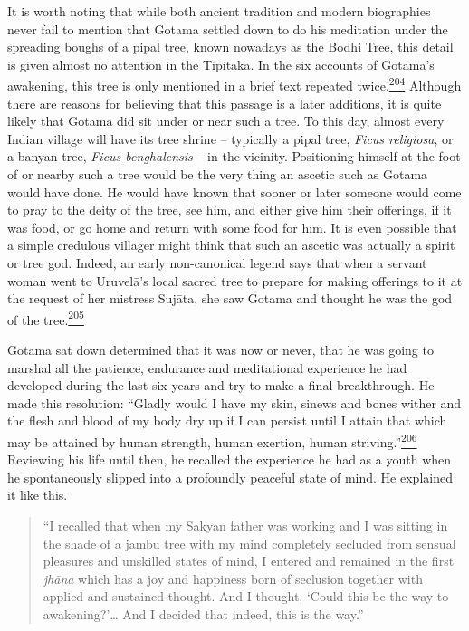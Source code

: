 It is worth noting that while both ancient tradition and modern
biographies never fail to mention that Gotama settled down to do his
meditation under the spreading boughs of a pipal tree, known nowadays as
the Bodhi Tree, this detail is given almost no attention in the
Tipitaka. In the six accounts of Gotama's awakening, this tree is only
mentioned in a brief text repeated
twice.\label{footprints_split_009.html_fnref204}\hyperref[footprints_split_024.htmlux5cux23fn204]{\textsuperscript{204}}
Although there are reasons for believing that this passage is a later
additions, it is quite likely that Gotama did sit under or near such a
tree. To this day, almost every Indian village will have its tree shrine
-- typically a pipal tree, \emph{Ficus religiosa}, or a banyan tree,
\emph{Ficus benghalensis} -- in the vicinity. Positioning himself at the
foot of or nearby such a tree would be the very thing an ascetic such as
Gotama would have done. He would have known that sooner or later someone
would come to pray to the deity of the tree, see him, and either give
him their offerings, if it was food, or go home and return with some
food for him. It is even possible that a simple credulous villager might
think that such an ascetic was actually a spirit or tree god. Indeed, an
early non-canonical legend says that when a servant woman went to
Uruvelā's local sacred tree to prepare for making offerings to it at the
request of her mistress Sujāta, she saw Gotama and thought he was the
god of the
tree.\label{footprints_split_009.html_fnref205}\hyperref[footprints_split_024.htmlux5cux23fn205]{\textsuperscript{205}}

Gotama sat down determined that it was now or never, that he was going
to marshal all the patience, endurance and meditational experience he
had developed during the last six years and try to make a final
breakthrough. He made this resolution: ``Gladly would I have my skin,
sinews and bones wither and the flesh and blood of my body dry up if I
can persist until I attain that which may be attained by human strength,
human exertion, human
striving.''\label{footprints_split_009.html_fnref206}\hyperref[footprints_split_024.htmlux5cux23fn206]{\textsuperscript{206}}
Reviewing his life until then, he recalled the experience he had as a
youth when he spontaneously slipped into a profoundly peaceful state of
mind. He explained it like this.

\begin{quote}
``I recalled that when my Sakyan father was working and I was sitting in
the shade of a jambu tree with my mind completely secluded from sensual
pleasures and unskilled states of mind, I entered and remained in the
first \emph{jhāna} which has a joy and happiness born of seclusion
together with applied and sustained thought. And I thought, `Could this
be the way to awakening?'\ldots{} And I decided that indeed, this is the
way.''
\end{quote}

